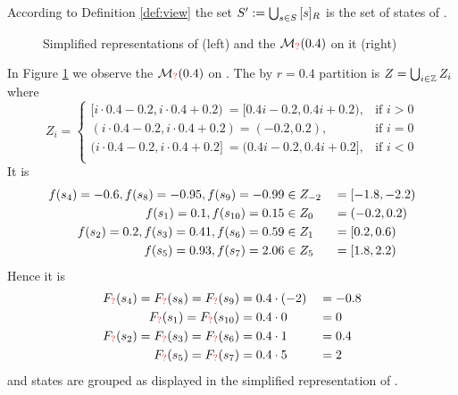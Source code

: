 \documentclass[preview]{standalone}
\begin{document}
According to Definition \ref{def:view} the set ${S}' := \bigcup_{{s} \in {S}} {{[{s}]_{{R}}}}$ is the set of states of \viewprop.

\begin{figure}[h]
	\begin{minipage}{.6\textwidth}
		
	\end{minipage}%
	\begin{minipage}{.5\textwidth}
		
	\end{minipage}
	\caption{Simplified representations of \mdp (left) and the \viewN ${{{{{\mathcal{M}}}}_{{{\color{red}?}}}}}(0.4)$ on it (right)}
	\label{fig:PropBeforeAfter}  
\end{figure}
In Figure \ref{fig:PropBeforeAfter} we observe the \viewN ${{{{{\mathcal{M}}}}_{{{\color{red}?}}}}}(0.4)$ on \chgph. The by $r=0.4$ partition is $Z = \bigcup_{i \in {\mathbb{Z}}} Z_i$ where
\[
Z_i = 
\begin{cases}
	[i \cdot 0.4 -  0.2, i \cdot 0.4 +  0.2) \:\!= [0.4i - 0.2, 0.4i + 0.2) , &\text{if } i > 0 \\
	(i \cdot 0.4 -  0.2, i \cdot 0.4 +  0.2) = (-0.2, 0.2), &\text{if } i = 0 \\
	(i \cdot 0.4 -  0.2, i \cdot 0.4 +  0.2] \:\!= (0.4i - 0.2, 0.4i + 0.2], &\text{if } i < 0 \\
\end{cases}
\]
It is 
\begin{alignat*}{3}
	{f}({s}_4)=-0.6, {f}({s}_8)=-0.95, {f}({s}_9) = -0.99 &\in Z_{-2} &&= [-1.8, -2.2) \\
	{f}({s}_1)=0.1, {f}({s}_{10})=0.15 &\in Z_0 &&= (-0.2, 0.2)\\
	{f}({s}_2)=0.2, {f}({s}_3)=0.41, {f}({s}_6) = 0.59 &\in Z_1 &&= [0.2, 0.6) \\
	{f}({s}_5)=0.93, {f}({s}_{7})=2.06 &\in Z_5 &&= [1.8, 2.2) \\
\end{alignat*}
Hence it is
\begin{alignat*}{3}
 	{\ensuremath{{F_{{{\color{red}?}}}}}}({s}_4) = {{F_{{{\color{red}?}}}}}({s}_{8}) = {{F_{{{\color{red}?}}}}}({s}_{9}) &= 0.4\cdot(-2) &&= -0.8 \\
 	{{F_{{{\color{red}?}}}}}({s}_1) = {{F_{{{\color{red}?}}}}}({s}_{10}) &= 0.4\cdot0 &&= 0 \\
 	{{F_{{{\color{red}?}}}}}({s}_2) = {{F_{{{\color{red}?}}}}}({s}_{3}) = {{F_{{{\color{red}?}}}}}({s}_{6}) &= 0.4\cdot1 &&= 0.4 \\
 	{{F_{{{\color{red}?}}}}}({s}_5) = {{F_{{{\color{red}?}}}}}({s}_{7}) &= 0.4\cdot5 &&= 2 \\
\end{alignat*}
and states are grouped as displayed in the simplified representation of \viewprop.
\end{document}
